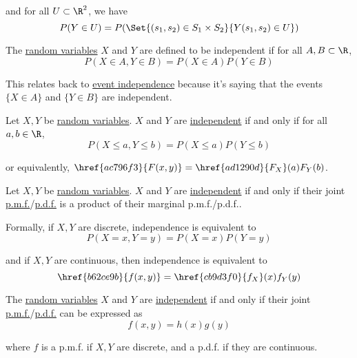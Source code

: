 and for all $U\subset\R^2$, we have
$$
  P(Y\in U)=P(\Set{(s_1,s_2)\in S_1\times S_2}{Y(s_1,s_2)\in U})
$$

\label{f0da4c0}

The \href{b96960b}{random variables} $X$ and $Y$ are defined to be independent
if for all $A,B\subset\R$,
$$
  P(X\in A,Y\in B)=P(X\in A)P(Y\in B)
$$

This relates back to \href{cb4d04c}{event independence} because it's saying
that the events $\{X\in A\}$ and $\{Y\in B\}$ are independent.

\label{b52c619}

Let $X,Y$ be \href{b96960b}{random variables}. $X$ and $Y$ are
\href{f0da4c0}{independent} if and only if for all $a,b\in\R$,
$$
  P(X\leq a,Y\leq b)=P(X\leq a)P(Y\leq b)
$$

or equivalently, $\href{ac796f3}{F(x,y)}=\href{ad1290d}{F_X}(a)F_Y(b)$.

\label{d8adbf8}

Let $X,Y$ be \href{b96960b}{random variables}. $X$ and $Y$ are
\href{f0da4c0}{independent} if and only if their joint
\href{bcef5f1}{p.m.f.}/\href{cb9d3f0}{p.d.f.} is a product of their marginal
p.m.f./p.d.f..

Formally, if $X,Y$ are discrete, independence is equivalent to
$$
  P(X=x,Y=y)=P(X=x)P(Y=y)
$$

and if $X,Y$ are continuous, then independence is equivalent to
$$
  \href{b62ce9b}{f(x,y)}=\href{cb9d3f0}{f_X}(x)f_Y(y)
$$

\label{b90dd80}

The \href{b96960b}{random variables} $X$ and $Y$ are
\href{f0da4c0}{independent} if and only if their joint
\href{e00d4ea}{p.m.f.}/\href{b62ce9b}{p.d.f.} can be expressed as
$$
  f(x,y)=h(x)g(y)
$$

where $f$ is a p.m.f. if $X,Y$ are discrete, and a p.d.f. if they are
continuous.

